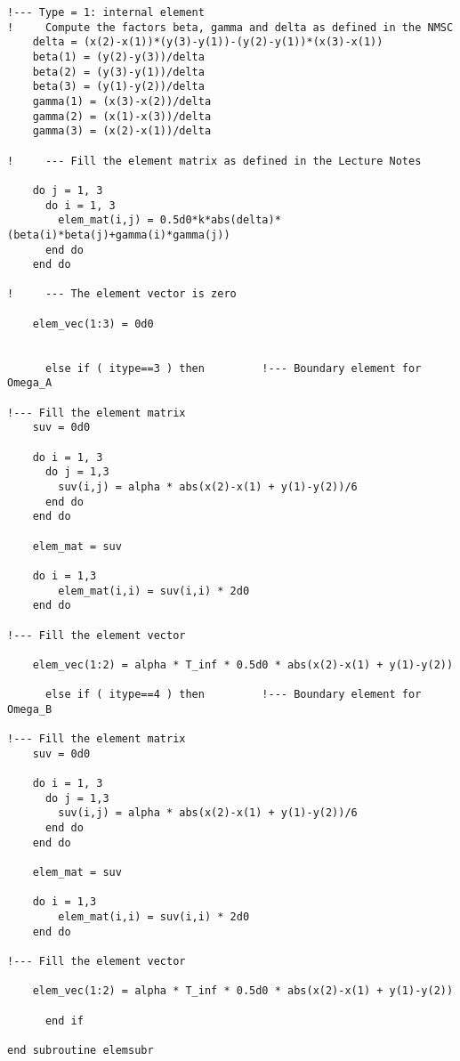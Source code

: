 \begin{lstlisting}
!--- Type = 1: internal element
!	  Compute the factors beta, gamma and delta as defined in the NMSC
	delta = (x(2)-x(1))*(y(3)-y(1))-(y(2)-y(1))*(x(3)-x(1))
	beta(1) = (y(2)-y(3))/delta
	beta(2) = (y(3)-y(1))/delta
	beta(3) = (y(1)-y(2))/delta
	gamma(1) = (x(3)-x(2))/delta
	gamma(2) = (x(1)-x(3))/delta
	gamma(3) = (x(2)-x(1))/delta
	
!     --- Fill the element matrix as defined in the Lecture Notes

	do j = 1, 3
	  do i = 1, 3
	    elem_mat(i,j) = 0.5d0*k*abs(delta)*(beta(i)*beta(j)+gamma(i)*gamma(j))
	  end do
	end do
	
!     --- The element vector is zero
  
	elem_vec(1:3) = 0d0
	
	
      else if ( itype==3 ) then   		!--- Boundary element for Omega_A
	
!--- Fill the element matrix
	suv = 0d0
	
	do i = 1, 3
	  do j = 1,3
	    suv(i,j) = alpha * abs(x(2)-x(1) + y(1)-y(2))/6
	  end do
	end do
	
	elem_mat = suv
	
	do i = 1,3
	    elem_mat(i,i) = suv(i,i) * 2d0
	end do
	
!--- Fill the element vector

	elem_vec(1:2) = alpha * T_inf * 0.5d0 * abs(x(2)-x(1) + y(1)-y(2))
	
      else if ( itype==4 ) then   		!--- Boundary element for Omega_B
	
!--- Fill the element matrix
	suv = 0d0
	
	do i = 1, 3
	  do j = 1,3
	    suv(i,j) = alpha * abs(x(2)-x(1) + y(1)-y(2))/6
	  end do
	end do
	
	elem_mat = suv
	
	do i = 1,3
	    elem_mat(i,i) = suv(i,i) * 2d0
	end do
	
!--- Fill the element vector

	elem_vec(1:2) = alpha * T_inf * 0.5d0 * abs(x(2)-x(1) + y(1)-y(2))
	
      end if
      
end subroutine elemsubr
\end{lstlisting}


